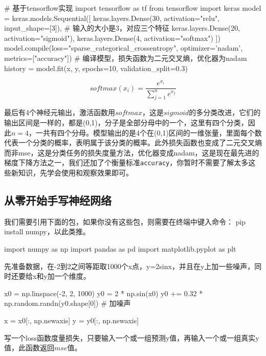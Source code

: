 \documentclass[a5paper, 11pt]{ctexbook}
\begin{document}
\newpage

\begin{python}
    # 基于tensorflow实现
    import tensorflow as tf
    from tensorflow import keras
    model = keras.models.Sequential([
            keras.layers.Dense(30, activation="relu", input_shape=[3]),
            # 输入的大小是3，对应三个特征
            keras.layers.Dense(20, activation="sigmoid"),
            keras.layers.Dense(4, activation="softmax")
        ])
    model.compile(loss="sparse_categorical_crossentropy", optimizer='nadam', metrics=["accuracy"])
    # 编译模型，损失函数为二元交叉熵，优化器为nadam
    history = model.fit(x, y, epochs=10,
    validation_split=0.3)
\end{python}

\begin{equation}
    softmax(x_i) = \frac{e^{x_i}}{\sum^{n}_{j=1}{e^{x_j}}}
\end{equation}

最后有4个神经元输出，激活函数用$softmax$，这是$sigmoid$的多分类改进，它们的输出区间是一样的，都是(0,1)，分子是全部分母中的一个，这里有四个分类，因此$n=4$，一共有四个分母。模型输出的是4个在(0,1)区间的一维张量，里面每个数代表一个分类的概率，表明属于该分类的概率。此外损失函数也变成了二元交叉熵而非mse，这是分类任务的损失度量方法，优化器变成nadam，这是现在最先进的梯度下降方法之一，我们还加了个衡量标准\verb|accuracy|，你暂时不需要了解太多这些新知识，先学会使用和观察效果即可。

\subsection{从零开始手写神经网络}

我们需要引用下面的包，如果你没有这些包，则需要在终端中键入命令：
pip install numpy，以此类推。
\begin{python}
    import numpy as np
    import pandas as pd
    import matplotlib.pyplot as plt
\end{python}

先准备数据，在-2到2之间等距取1000个x点，y=2sinx，并且在y上加一些噪声，同时还要给x和y加一个维度。
\begin{python}
    x0 = np.linspace(-2, 2, 1000)
    y0 = 2 * np.sin(x0)
    y0 += 0.32 * np.random.randn(y0.shape[0]) # 加噪声

    x = x0[:, np.newaxis]
    y = y0[:, np.newaxis]
\end{python}

写一个loss函数度量损失，只要输入一个或一组预测y值，再输入一个或一组真实y值，此函数返回$mse$值。
\end{document}
